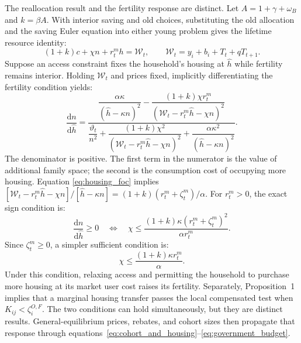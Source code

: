\documentclass[10pt]{article}
\theoremstyle{definition}
\newcommand{\dd}{\mathrm d}
\begin{document}
The reallocation result and the fertility response are distinct. Let
$A=1+\gamma+\omega_B$ and $k=\beta A$. With interior saving and old choices,
substituting the old allocation and the saving Euler equation into either young
problem gives the lifetime resource identity:
\begin{equation}
 (1+k)c+\chi n+r_t^m h=\mathcal W_t,
 \qquad
 \mathcal W_t=y_i+b_i+T_t+qT_{t+1}.
 \label{eq:lifetime_budget}
\end{equation}
Suppose an access constraint fixes the household's housing at $\widehat h$ while
fertility remains interior. Holding $\mathcal W_t$ and prices fixed, implicitly
differentiating the fertility condition yields:
\begin{equation}
 \frac{\dd n}{\dd \widehat h}
 =\frac{
 \dfrac{\alpha\kappa}{(\widehat h-\kappa n)^2}
 -\dfrac{(1+k)\chi r_t^m}
 {(\mathcal W_t-r_t^m\widehat h-\chi n)^2}}
 {\dfrac{\vartheta_t}{n^2}
 +\dfrac{(1+k)\chi^2}
 {(\mathcal W_t-r_t^m\widehat h-\chi n)^2}
 +\dfrac{\alpha\kappa^2}{(\widehat h-\kappa n)^2}}.
 \label{eq:fertility_cap_derivative}
\end{equation}
The denominator is positive. The first term in the numerator is the value of
additional family space; the second is the consumption cost of occupying more
housing. Equation
\eqref{eq:housing_foc} implies
$[\mathcal W_t-r_t^m\widehat h-\chi n]/[\widehat h-\kappa n]
=(1+k)(r_t^m+\zeta_t^m)/\alpha$. For $r_t^m>0$, the exact sign condition is:
\begin{equation}
 \frac{\dd n}{\dd\widehat h}\geq0
 \quad\Longleftrightarrow\quad
 \chi\leq
 \frac{(1+k)\kappa(r_t^m+\zeta_t^m)^2}{\alpha r_t^m}.
 \label{eq:fertility_exact_condition}
\end{equation}
Since $\zeta_t^m\geq0$, a simpler sufficient condition is:
\begin{equation}
 \chi\leq\frac{(1+k)\kappa r_t^m}{\alpha}.
 \label{eq:fertility_sufficient_condition}
\end{equation}
Under this condition, relaxing access and permitting the household to purchase
more housing at its market user cost raises its fertility. Separately,
Proposition~1 implies that a marginal housing transfer passes the local
compensated test when $K_{ij}<\zeta_i^{O,F}$. The two conditions can hold
simultaneously, but they are distinct results.
General-equilibrium prices, rebates, and cohort sizes then propagate that
response through
equations~\eqref{eq:cohort_and_housing}--\eqref{eq:government_budget}.
\end{document}
